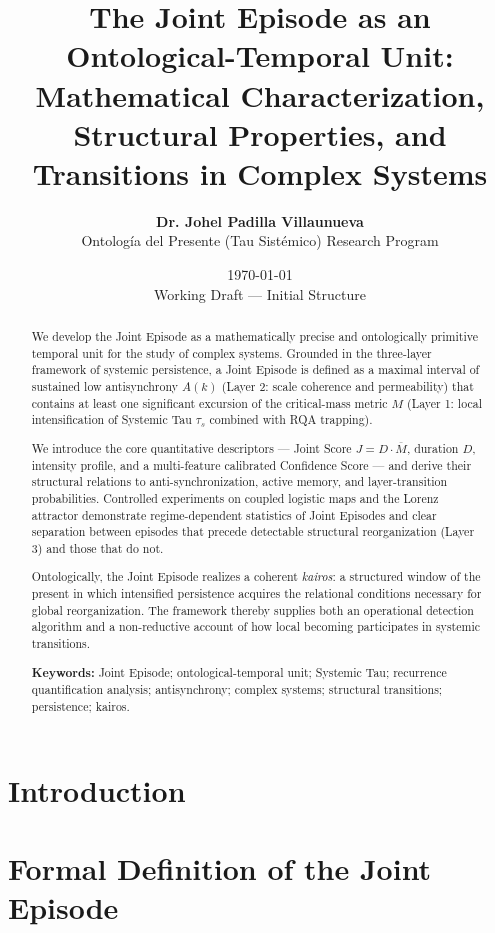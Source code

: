 \documentclass[11pt,a4paper]{article}
\title{\textbf{The Joint Episode as an Ontological-Temporal Unit:}\\[0.25em]
\large Mathematical Characterization, Structural Properties, and Transitions in Complex Systems}
\author{
    \textbf{Dr. Johel Padilla Villaunueva}\\[0.2em]
    \small Ontología del Presente (Tau Sistémico) Research Program
}
\date{\today \\ \small Working Draft — Initial Structure}
\begin{document}
\maketitle

\begin{abstract}
\noindent
We develop the Joint Episode as a mathematically precise and ontologically primitive temporal unit for the study of complex systems. Grounded in the three-layer framework of systemic persistence, a Joint Episode is defined as a maximal interval of sustained low antisynchrony $A(k)$ (Layer 2: scale coherence and permeability) that contains at least one significant excursion of the critical-mass metric $M$ (Layer 1: local intensification of Systemic Tau $\tau_s$ combined with RQA trapping). 

We introduce the core quantitative descriptors — Joint Score $J = D \cdot \overline{M}$, duration $D$, intensity profile, and a multi-feature calibrated Confidence Score — and derive their structural relations to anti-synchronization, active memory, and layer-transition probabilities. Controlled experiments on coupled logistic maps and the Lorenz attractor demonstrate regime-dependent statistics of Joint Episodes and clear separation between episodes that precede detectable structural reorganization (Layer 3) and those that do not.

Ontologically, the Joint Episode realizes a coherent \textit{kairos}: a structured window of the present in which intensified persistence acquires the relational conditions necessary for global reorganization. The framework thereby supplies both an operational detection algorithm and a non-reductive account of how local becoming participates in systemic transitions.

\vspace{0.1em}
\noindent\textbf{Keywords:} Joint Episode; ontological-temporal unit; Systemic Tau; recurrence quantification analysis; antisynchrony; complex systems; structural transitions; persistence; kairos.
\end{abstract}

\vspace{0.5em}

\section{Introduction}


\section{Formal Definition of the Joint Episode}

\end{document}
